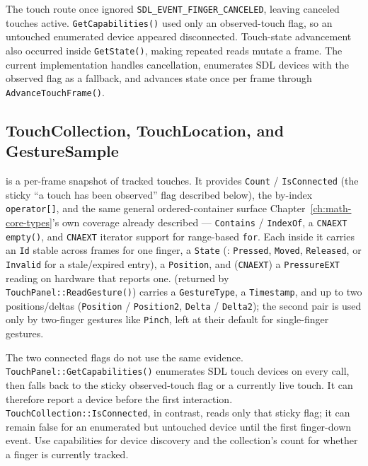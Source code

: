\begin{historynote}
The touch route once ignored \texttt{SDL\_EVENT\_FINGER\_CANCELED}, leaving canceled touches
active. \texttt{GetCapabilities()} used only an observed-touch flag, so an untouched enumerated
device appeared disconnected. Touch-state advancement also occurred inside \texttt{GetState()},
making repeated reads mutate a frame. The current implementation handles cancellation, enumerates
SDL devices with the observed flag as a fallback, and advances state once per frame through
\texttt{AdvanceTouchFrame()}.
\end{historynote}

\subsection{TouchCollection, TouchLocation, and GestureSample}

 is a per-frame snapshot of tracked touches. It provides
\texttt{Count} / \texttt{IsConnected} (the sticky ``a touch has been observed'' flag described
below), the by-index \texttt{operator[]}, and the same general
ordered-container surface Chapter~\ref{ch:math-core-types}'s own  coverage already
described --- \texttt{Contains} / \texttt{IndexOf}, a \texttt{CNAEXT} \texttt{empty()}, and
\texttt{CNAEXT} iterator support for range-based \texttt{for}. Each  inside it carries
an \texttt{Id} stable across frames for one finger, a \texttt{State} (:
\texttt{Pressed}, \texttt{Moved}, \texttt{Released}, or \texttt{Invalid} for a stale/expired
entry), a \texttt{Position}, and (\texttt{CNAEXT}) a \texttt{PressureEXT} reading on hardware
that reports one.  (returned by \texttt{TouchPanel::ReadGesture()})
carries a \texttt{GestureType}, a \texttt{Timestamp}, and up to two positions/deltas
(\texttt{Position} / \texttt{Position2}, \texttt{Delta} / \texttt{Delta2}); the second pair is used
only by two-finger gestures like \texttt{Pinch}, left at their default for single-finger
gestures.

The two connected flags do not use the same evidence. \texttt{TouchPanel::GetCapabilities()}
enumerates SDL touch devices on every call, then falls back to the sticky observed-touch flag or a
currently live touch. It can therefore report a device before the first interaction.
\texttt{TouchCollection::IsConnected}, in contrast, reads only that sticky flag; it can remain
false for an enumerated but untouched device until the first finger-down event. Use capabilities
for device discovery and the collection's count for whether a finger is currently tracked.

